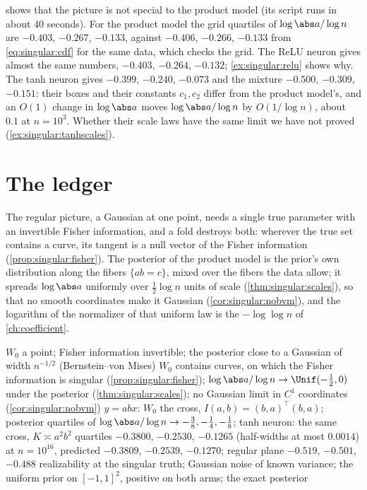 \begin{refsection}
 shows that the picture is not special to the product model (its script runs in about $40$ seconds). For the product model the grid quartiles of $\log\abs a/\log n$ are $-0.403$, $-0.267$, $-0.133$, against $-0.406$, $-0.266$, $-0.133$ from \eqref{eq:singular:cdf} for the same data, which checks the grid. The ReLU neuron gives almost the same numbers, $-0.403$, $-0.264$, $-0.132$; \cref{ex:singular:relu} shows why. The tanh neuron gives $-0.399$, $-0.240$, $-0.073$ and the mixture $-0.500$, $-0.309$, $-0.151$: their boxes and their constants $c_1,c_2$ differ from the product model's, and an $O(1)$ change in $\log\abs a$ moves $\log\abs a/\log n$ by $O(1/\log n)$, about $0.1$ at $n=10^3$. Whether their scale laws have the same limit we have not proved (\cref{ex:singular:tanhscales}).

\section{The ledger}\label{sec:singular:ledger}

The regular picture, a Gaussian at one point, needs a single true parameter with an invertible Fisher information, and a fold destroys both: wherever the true set contains a curve, its tangent is a null vector of the Fisher information (\cref{prop:singular:fisher}). The posterior of the product model is the prior's own distribution along the fibers $\{ab=c\}$, mixed over the fibers the data allow; it spreads $\log\abs a$ uniformly over $\frac12\log n$ units of scale (\cref{thm:singular:scales}), so that no smooth coordinates make it Gaussian (\cref{cor:singular:nobvm}), and the logarithm of the normalizer of that uniform law is the $-\log\log n$ of \cref{ch:coefficient}.

{$W_0$ a point; Fisher information invertible; the posterior close to a Gaussian of width $n^{-1/2}$ (Bernstein--von Mises)}
{$W_0$ contains curves, on which the Fisher information is singular (\cref{prop:singular:fisher}); $\log\abs a/\log n\to\Unif(-\frac12,0)$ under the posterior (\cref{thm:singular:scales}); no Gaussian limit in $C^1$ coordinates (\cref{cor:singular:nobvm})}
{$y=abx$: $W_0$ the cross, $I(a,b)=(b,a)^\top(b,a)$; posterior quartiles of $\log\abs a/\log n\to-\frac38,-\frac14,-\frac18$; tanh neuron: the same cross, $K\asymp a^2b^2$}
{quartiles $-0.3800$, $-0.2530$, $-0.1265$ (half-widths at most $0.0014$) at $n=10^{16}$, predicted $-0.3809$, $-0.2539$, $-0.1270$; regular plane $-0.519$, $-0.501$, $-0.488$}
{realizability at the singular truth; Gaussian noise of known variance; the uniform prior on $[-1,1]^2$, positive on both arms; the exact posterior}


\end{refsection}
